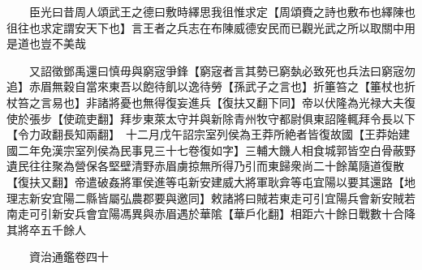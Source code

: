 　　臣光曰昔周人頌武王之德曰敷時繹思我徂惟求定【周頌賚之詩也敷布也繹陳也徂往也求定謂安天下也】言王者之兵志在布陳威德安民而已觀光武之所以取關中用是道也豈不美哉

　　又詔徵鄧禹還曰慎毋與窮宼爭鋒【窮宼者言其勢已窮埶必致死也兵法曰窮宼勿追】赤眉無穀自當來東吾以飽待飢以逸待勞【孫武子之言也】折箠笞之【箠杖也折杖笞之言易也】非諸將憂也無得復妄進兵【復扶又翻下同】帝以伏隆為光禄大夫復使於張步【使疏吏翻】拜步東萊太守并與新除青州牧守都尉俱東詔隆輒拜令長以下【令力政翻長知兩翻】　十二月戊午詔宗室列侯為王莽所絶者皆復故國【王莽始建國二年免漢宗室列侯為民事見三十七卷復如字】三輔大饑人相食城郭皆空白骨蔽野遺民往往聚為營保各堅壁清野赤眉虜掠無所得乃引而東歸衆尚二十餘萬隨道復散【復扶又翻】帝遣破姦將軍侯進等屯新安建威大將軍耿弇等屯宜陽以要其還路【地理志新安宜陽二縣皆屬弘農郡要與邀同】敕諸將曰賊若東走可引宜陽兵會新安賊若南走可引新安兵會宜陽馮異與赤眉遇於華隂【華戶化翻】相距六十餘日戰數十合降其將卒五千餘人

　　資治通鑑卷四十


    


 


 



 

 
  







 


　　
　　
　
　
　


　　

　















	
	









































